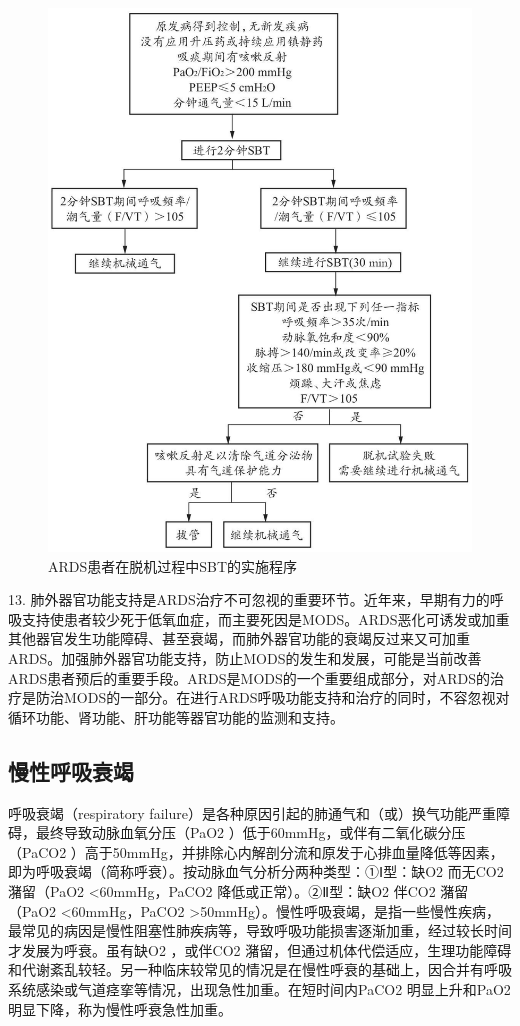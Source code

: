 \begin{figure}[!htbp]
 \centering
 \includegraphics{./images/Image00041.jpg}
 \captionsetup{justification=centering}
 \caption{ARDS患者在脱机过程中SBT的实施程序}
 \label{fig1-17-2}
  \end{figure} 

13.
肺外器官功能支持是ARDS治疗不可忽视的重要环节。近年来，早期有力的呼吸支持使患者较少死于低氧血症，而主要死因是MODS。ARDS恶化可诱发或加重其他器官发生功能障碍、甚至衰竭，而肺外器官功能的衰竭反过来又可加重ARDS。加强肺外器官功能支持，防止MODS的发生和发展，可能是当前改善ARDS患者预后的重要手段。ARDS是MODS的一个重要组成部分，对ARDS的治疗是防治MODS的一部分。在进行ARDS呼吸功能支持和治疗的同时，不容忽视对循环功能、肾功能、肝功能等器官功能的监测和支持。

\subsection{慢性呼吸衰竭}

呼吸衰竭（respiratory
failure）是各种原因引起的肺通气和（或）换气功能严重障碍，最终导致动脉血氧分压（PaO{2}
）低于60mmHg，或伴有二氧化碳分压（PaCO{2}
）高于50mmHg，并排除心内解剖分流和原发于心排血量降低等因素，即为呼吸衰竭（简称呼衰）。按动脉血气分析分两种类型：①Ⅰ型：缺O{2}
而无CO{2} 潴留（PaO{2} \textless{}60mmHg，PaCO{2}
降低或正常）。②Ⅱ型：缺O{2} 伴CO{2} 潴留（PaO{2}
\textless{}60mmHg，PaCO{2}
\textgreater{}50mmHg）。慢性呼吸衰竭，是指一些慢性疾病，最常见的病因是慢性阻塞性肺疾病等，导致呼吸功能损害逐渐加重，经过较长时间才发展为呼衰。虽有缺O{2}
，或伴CO{2}
潴留，但通过机体代偿适应，生理功能障碍和代谢紊乱较轻。另一种临床较常见的情况是在慢性呼衰的基础上，因合并有呼吸系统感染或气道痉挛等情况，出现急性加重。在短时间内PaCO{2}
明显上升和PaO{2} 明显下降，称为慢性呼衰急性加重。

